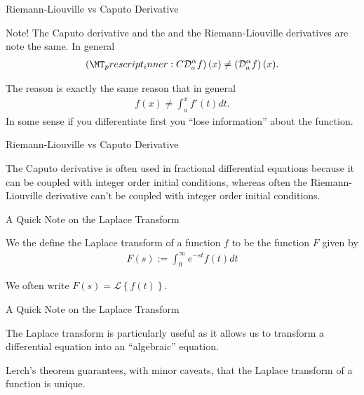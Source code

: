 \documentclass[pdf]{beamer}
\newcommand{\laplace}[1]{ \mathcal{L} \left\{ #1 \right\} }
\newcommand{\rld}[3]{ \left( \mathcal{D}_{#1}^{#2} #3 \right) }
\newcommand{\capder}[3]{ \left( \prescript{C}{}{\mathcal{D}_{#1}^{#2}} #3 \right) }
\begin{document}
\begin{frame}{ Riemann-Liouville vs Caputo Derivative}
	\begin{alertblock}{Note!}
		The Caputo derivative and the and the Riemann-Liouville derivatives are note the same.
		In general 
		\begin{align*}
			\capder{a}{\alpha}{f}(x) \neq \rld{a}{\alpha}{f}(x).
		\end{align*}
	\end{alertblock}
	The reason is exactly the same reason that in general
	\begin{align*}
		f(x) \neq \int_a^x f'(t) dt.
	\end{align*}
	In some sense if you differentiate first you ``lose information'' about the function.
\end{frame}

\begin{frame}{ Riemann-Liouville vs Caputo Derivative}

	The Caputo derivative is often used in fractional differential equations because it
	can be coupled with integer order initial conditions, whereas often the Riemann-Liouville
	derivative can't be coupled with integer order initial conditions.

\end{frame}

\begin{frame}{A Quick Note on the Laplace Transform}
	\begin{definition}
		We the define the Laplace transform of a function $ f $ to be the function $ F $
		given by
		\begin{align*}
			F(s) := \int_0^\infty e^{-st} f(t) dt
		\end{align*}
	\end{definition}
	
	We often write $ F(s) = \laplace{f(t)} $.
	
\end{frame}

\begin{frame}{A Quick Note on the Laplace Transform}
	
		
	
	The Laplace transform is particularly useful as it allows us to transform a differential equation into
	an ``algebraic'' equation. 
	
	Lerch's theorem guarantees, with minor caveats, that the Laplace transform of a function is
	unique.
	
\end{frame}
\end{document}

